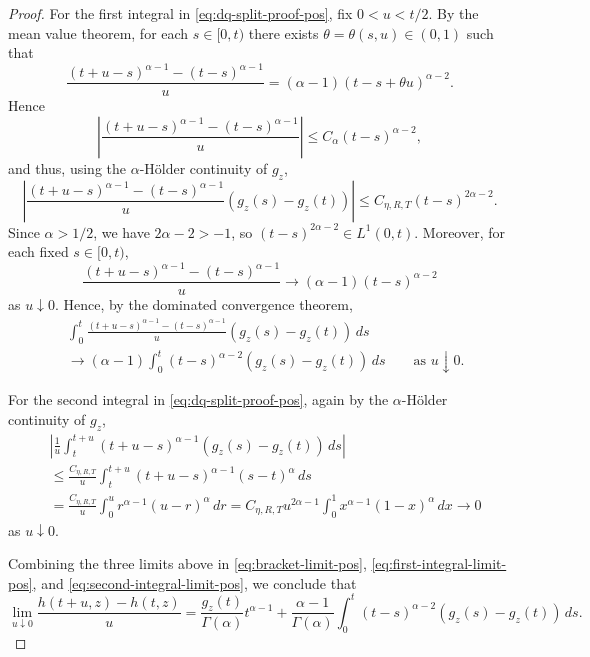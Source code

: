 \documentclass[10pt,a4paper]{amsart}
\begin{document}
\begin{proof}
For the first integral in \eqref{eq:dq-split-proof-pos}, fix $0<u<t/2$. By the mean value theorem,
for each $s\in[0,t)$ there exists $\theta=\theta(s,u)\in(0,1)$ such that
\[
  \frac{(t+u-s)^{\alpha-1}-(t-s)^{\alpha-1}}{u}
  =
  (\alpha-1)(t-s+\theta u)^{\alpha-2}.
\]
Hence
\[
  \left|
    \frac{(t+u-s)^{\alpha-1}-(t-s)^{\alpha-1}}{u}
  \right|
  \le C_\alpha (t-s)^{\alpha-2},
\]
and thus, using the $\alpha$-H\"older continuity of $g_z$,
\[
  \left|
    \frac{(t+u-s)^{\alpha-1}-(t-s)^{\alpha-1}}{u}
    \left(g_z(s)-g_z(t)\right)
  \right|
  \le C_{\eta,R,T}(t-s)^{2\alpha-2}.
\]
Since $\alpha>1/2$, we have $2\alpha-2>-1$, so $(t-s)^{2\alpha-2}\in L^1(0,t)$.
Moreover, for each fixed $s\in[0,t)$,
\[
  \frac{(t+u-s)^{\alpha-1}-(t-s)^{\alpha-1}}{u}
  \to
  (\alpha-1)(t-s)^{\alpha-2}
\]
as $u\downarrow0$. Hence, by the dominated convergence theorem,
\begin{align}
  &\int_0^t
  \frac{(t+u-s)^{\alpha-1}-(t-s)^{\alpha-1}}{u}
  \left(g_z(s)-g_z(t)\right)\,ds
  \nonumber\\
  &\to
  (\alpha-1)\int_0^t (t-s)^{\alpha-2}\left(g_z(s)-g_z(t)\right)\,ds
  \qquad\text{as }u\downarrow0.
  \label{eq:first-integral-limit-pos}
\end{align}

For the second integral in \eqref{eq:dq-split-proof-pos}, again by the $\alpha$-H\"older continuity of $g_z$,
\begin{align}
  &\left|
    \frac{1}{u}\int_t^{t+u}(t+u-s)^{\alpha-1}
    \left(g_z(s)-g_z(t)\right)\,ds
  \right|
  \nonumber\\
  &\le
  \frac{C_{\eta,R,T}}{u}\int_t^{t+u}(t+u-s)^{\alpha-1}(s-t)^\alpha\,ds
  \nonumber\\
 &=
  \frac{C_{\eta,R,T}}{u}\int_0^u r^{\alpha-1}(u-r)^\alpha\,dr
 =
  C_{\eta,R,T}u^{2\alpha-1}\int_0^1 x^{\alpha-1}(1-x)^\alpha\,dx
  \to0
\label{eq:second-integral-limit-pos}
\end{align}
as $u\downarrow0$.

Combining the three limits above in \eqref{eq:bracket-limit-pos}, \eqref{eq:first-integral-limit-pos}, and \eqref{eq:second-integral-limit-pos},
we conclude that
\begin{equation}
  \lim_{u\downarrow0}\frac{h(t+u,z)-h(t,z)}{u}
  =
  \frac{g_z(t)}{\Gamma(\alpha)}t^{\alpha-1}
  +
  \frac{\alpha-1}{\Gamma(\alpha)}
  \int_0^t (t-s)^{\alpha-2}\left(g_z(s)-g_z(t)\right)\,ds .
  \label{eq:right-derivative-proof}
\end{equation}


\end{proof}
\end{document}
